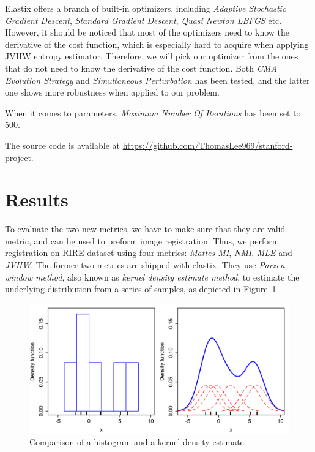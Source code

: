 \documentclass{IEEEtran}
\begin{document}
  Elastix offers a branch of built-in optimizers, including \emph{Adaptive Stochastic Gradient Descent}, \emph{Standard Gradient Descent}, \emph{Quasi Newton LBFGS} etc. However, it should be noticed that most of the optimizers need to know the derivative of the cost function, which is especially hard to acquire when applying JVHW entropy estimator. Therefore, we will pick our optimizer from the ones that do not need to know the derivative of the cost function. Both \emph{CMA Evolution Strategy} and \emph{Simultaneous Perturbation} has been tested, and the latter one shows more robustness when applied to our problem.

  When it comes to parameters, \emph{Maximum Number Of Iterations} has been set to 500.

  The source code is available at \url{https://github.com/ThomasLee969/stanford-project}.

  \section{Results}

  To evaluate the two new metrics, we have to make sure that they are valid metric, and can be used to preform image registration. Thus, we perform registration on RIRE dataset using four metrics: \emph{Mattes MI}, \emph{NMI}, \emph{MLE} and \emph{JVHW}. The former two metrics are shipped with elastix. They use \emph{Parzen window method}, also known as \emph{kernel density estimate method}, to estimate the underlying distribution from a series of samples, as depicted in Figure~\ref{fig:parzenhistogram}

  \begin{figure}[htbp]
    \centering
    \includegraphics[width=\columnwidth]{parzenhistogram.png}
    \caption{Comparison of a histogram and a kernel density estimate.}
    \label{fig:parzenhistogram}
  \end{figure}
\end{document}
